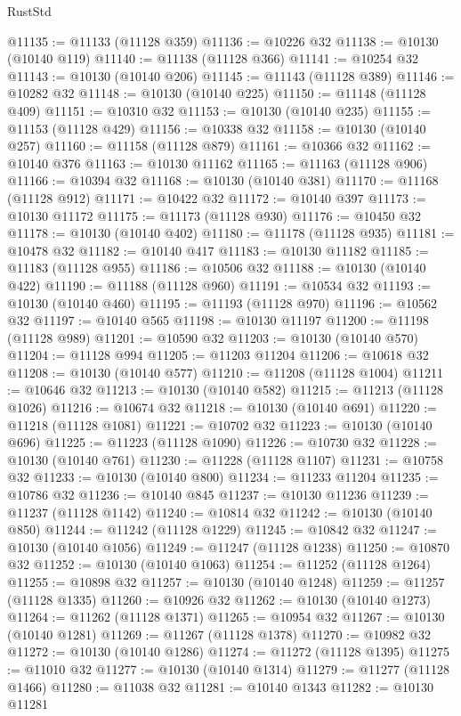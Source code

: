 \begin{lexlean}{RustStd}
\begin{coremodule}
@11135 := @11133 (@11128 @359)
@11136 := @10226 @32
@11138 := @10130 (@10140 @119)
@11140 := @11138 (@11128 @366)
@11141 := @10254 @32
@11143 := @10130 (@10140 @206)
@11145 := @11143 (@11128 @389)
@11146 := @10282 @32
@11148 := @10130 (@10140 @225)
@11150 := @11148 (@11128 @409)
@11151 := @10310 @32
@11153 := @10130 (@10140 @235)
@11155 := @11153 (@11128 @429)
@11156 := @10338 @32
@11158 := @10130 (@10140 @257)
@11160 := @11158 (@11128 @879)
@11161 := @10366 @32
@11162 := @10140 @376
@11163 := @10130 @11162
@11165 := @11163 (@11128 @906)
@11166 := @10394 @32
@11168 := @10130 (@10140 @381)
@11170 := @11168 (@11128 @912)
@11171 := @10422 @32
@11172 := @10140 @397
@11173 := @10130 @11172
@11175 := @11173 (@11128 @930)
@11176 := @10450 @32
@11178 := @10130 (@10140 @402)
@11180 := @11178 (@11128 @935)
@11181 := @10478 @32
@11182 := @10140 @417
@11183 := @10130 @11182
@11185 := @11183 (@11128 @955)
@11186 := @10506 @32
@11188 := @10130 (@10140 @422)
@11190 := @11188 (@11128 @960)
@11191 := @10534 @32
@11193 := @10130 (@10140 @460)
@11195 := @11193 (@11128 @970)
@11196 := @10562 @32
@11197 := @10140 @565
@11198 := @10130 @11197
@11200 := @11198 (@11128 @989)
@11201 := @10590 @32
@11203 := @10130 (@10140 @570)
@11204 := @11128 @994
@11205 := @11203 @11204
@11206 := @10618 @32
@11208 := @10130 (@10140 @577)
@11210 := @11208 (@11128 @1004)
@11211 := @10646 @32
@11213 := @10130 (@10140 @582)
@11215 := @11213 (@11128 @1026)
@11216 := @10674 @32
@11218 := @10130 (@10140 @691)
@11220 := @11218 (@11128 @1081)
@11221 := @10702 @32
@11223 := @10130 (@10140 @696)
@11225 := @11223 (@11128 @1090)
@11226 := @10730 @32
@11228 := @10130 (@10140 @761)
@11230 := @11228 (@11128 @1107)
@11231 := @10758 @32
@11233 := @10130 (@10140 @800)
@11234 := @11233 @11204
@11235 := @10786 @32
@11236 := @10140 @845
@11237 := @10130 @11236
@11239 := @11237 (@11128 @1142)
@11240 := @10814 @32
@11242 := @10130 (@10140 @850)
@11244 := @11242 (@11128 @1229)
@11245 := @10842 @32
@11247 := @10130 (@10140 @1056)
@11249 := @11247 (@11128 @1238)
@11250 := @10870 @32
@11252 := @10130 (@10140 @1063)
@11254 := @11252 (@11128 @1264)
@11255 := @10898 @32
@11257 := @10130 (@10140 @1248)
@11259 := @11257 (@11128 @1335)
@11260 := @10926 @32
@11262 := @10130 (@10140 @1273)
@11264 := @11262 (@11128 @1371)
@11265 := @10954 @32
@11267 := @10130 (@10140 @1281)
@11269 := @11267 (@11128 @1378)
@11270 := @10982 @32
@11272 := @10130 (@10140 @1286)
@11274 := @11272 (@11128 @1395)
@11275 := @11010 @32
@11277 := @10130 (@10140 @1314)
@11279 := @11277 (@11128 @1466)
@11280 := @11038 @32
@11281 := @10140 @1343
@11282 := @10130 @11281

\end{coremodule}
\end{lexlean}
